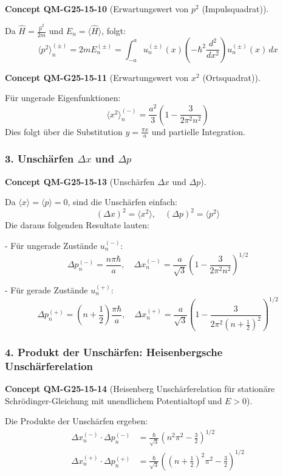 \documentclass[10pt, letterpaper]{article}
\newcommand{\CustomHeading}[3]{%
  \par\medskip\noindent%
  \textbf{#1 #2} \textnormal{(#3)}.\enskip%
}
\newenvironment{CONC}[2]{\begin{unitbox}\CustomHeading{Concept}{#1}{#2}}{\end{unitbox}}
\begin{document}
\begin{CONC}{QM-G25-15-10}{Erwartungswert von $p^2$ (Impulsquadrat)}
Da $\hat{H} = \frac{\hat{p}^2}{2m}$ und $E_n = \langle \hat{H} \rangle$, folgt:
\[
\langle p^2 \rangle_n^{(\pm)} = 2m E_n^{(\pm)} = \int_{-a}^{a} u_n^{(\pm)}(x) \left(-\hbar^2 \frac{d^2}{dx^2} \right) u_n^{(\pm)}(x)\, dx
\]
\end{CONC}



\begin{CONC}{QM-G25-15-11}{Erwartungswert von $x^2$ (Ortsquadrat)}
Für ungerade Eigenfunktionen:
\[
\langle x^2 \rangle_n^{(-)} = \frac{a^2}{3} \left(1 - \frac{3}{2\pi^2 n^2} \right)
\]
Dies folgt über die Substitution $y = \frac{\pi x}{a}$ und partielle Integration.
\end{CONC}


\subsubsection*{3. Unschärfen $\Delta x$ und $\Delta p$}

\begin{CONC}{QM-G25-15-13}{Unschärfen $\Delta x$ und $\Delta p$}
Da $\langle x \rangle = \langle p \rangle = 0$, sind die Unschärfen einfach:
\[
(\Delta x)^2 = \langle x^2 \rangle, \quad (\Delta p)^2 = \langle p^2 \rangle
\]
Die daraus folgenden Resultate lauten:

- Für ungerade Zustände \( u_n^{(-)} \):
  \[
  \Delta p_n^{(-)} = \frac{n \pi \hbar}{a}, \quad
  \Delta x_n^{(-)} = \frac{a}{\sqrt{3}} \left(1 - \frac{3}{2\pi^2 n^2} \right)^{1/2}
  \]

- Für gerade Zustände \( u_n^{(+)} \):
  \[
  \Delta p_n^{(+)} = \left(n + \frac{1}{2} \right) \frac{\pi \hbar}{a}, \quad
  \Delta x_n^{(+)} = \frac{a}{\sqrt{3}} \left(1 - \frac{3}{2\pi^2 (n + \frac{1}{2})^2} \right)^{1/2}
  \]
\end{CONC}

\subsubsection*{4. Produkt der Unschärfen: Heisenbergsche Unschärferelation}

\begin{CONC}{QM-G25-15-14}{Heisenberg Unschärferelation für stationäre Schrödinger-Gleichung mit unendlichem Potentialtopf und $E>0$}
Die Produkte der Unschärfen ergeben:
\[
\begin{aligned}
\Delta x_n^{(-)} \cdot \Delta p_n^{(-)} &= \frac{\hbar}{\sqrt{3}} \left(n^2 \pi^2 - \frac{3}{2} \right)^{1/2} \\
\Delta x_n^{(+)} \cdot \Delta p_n^{(+)} &= \frac{\hbar}{\sqrt{3}} \left((n + \tfrac{1}{2})^2 \pi^2 - \frac{3}{2} \right)^{1/2}
\end{aligned}
\]
\end{CONC}
\end{document}

